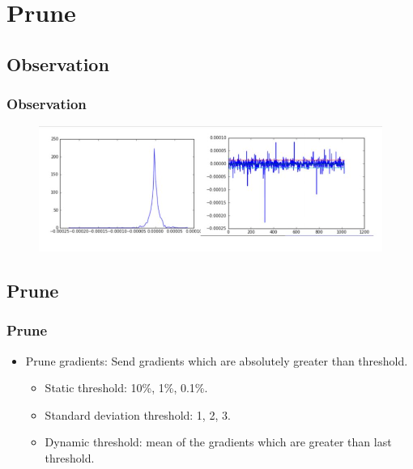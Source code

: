 \section{Prune}

\subsection{Observation}
\begin{frame}
    \frametitle{Observation}
	\begin{figure}
		\includegraphics[scale=0.4]{figure/gradient_observation.JPG}
	\end{figure}
\end{frame}


\subsection{Prune}
\begin{frame}
    \frametitle{Prune}
    \begin{itemize}
		\item Prune gradients: Send gradients which are absolutely greater than threshold. 
			\begin{itemize}
				\item Static threshold: 10\%, 1\%, 0.1\%. 
				\item Standard deviation threshold: 1, 2, 3. 
				\item Dynamic threshold: mean of the gradients which are greater than last threshold. 
			\end{itemize}
	\end{itemize}
\end{frame}

